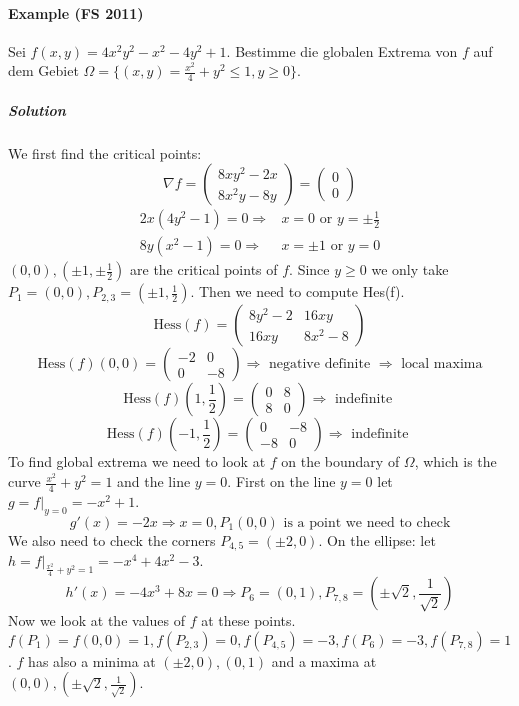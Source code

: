 \documentclass[11pt,a4paper]{book}
\begin{document}
\paragraph*{Example (FS 2011)}
Sei $f(x,y)=4x^2y^2-x^2-4y^2+1$. Bestimme die globalen Extrema von $f$ auf dem Gebiet $\Omega=\{(x,y)=\frac{x^2}{4}+y^2\leq 1, y\geq0\}$.
\subparagraph*{Solution}
We first find the critical points:
$$\nabla f=\begin{pmatrix} 8xy^2-2x \\ 8x^2y-8y \end{pmatrix} =  \begin{pmatrix}
0 \\ 
0
\end{pmatrix} $$
\begin{align*}
2x(4y^2-1)=0 \Rightarrow & x=0 \mbox{ or } y=\pm \frac{1}{2} \\
8y(x^2-1)=0 \Rightarrow & x=\pm 1 \mbox{ or } y=0
\end{align*}
$(0,0), (\pm 1, \pm \frac{1}{2})$ are the critical points of $f$. Since $y\geq 0$ we only take $P_1=(0,0), P_{2,3}=(\pm 1, \frac{1}{2})$. Then we need to compute Hes(f).
$$\mbox{Hess}(f)=\begin{pmatrix}
8y^2-2 & 16xy \\ 
16xy & 8x^2-8
\end{pmatrix} $$
$$\mbox{Hess}(f)(0,0)=\begin{pmatrix}
-2 & 0 \\ 
0 & -8
\end{pmatrix} \Rightarrow \mbox{ negative definite } \Rightarrow \mbox{ local maxima}$$ 
$$\mbox{Hess}(f)(1,\frac{1}{2})=\begin{pmatrix}
0 & 8 \\ 
8 & 0
\end{pmatrix} \Rightarrow \mbox{ indefinite }$$ 
$$\mbox{Hess}(f)(-1,\frac{1}{2})=\begin{pmatrix}
0 & -8 \\ 
-8 & 0
\end{pmatrix} \Rightarrow \mbox{ indefinite }$$ 
To find global extrema we need to look at $f$ on the boundary of $\Omega$, which is the curve $\frac{x^2}{4}+y^2=1$ and the line $y=0$. First on the line $y=0$ let $g=f|_{y=0}=-x^2+1$. $$g'(x)=-2x \Rightarrow x=0, P_1(0,0) \mbox{ is a point we need to check}$$
We also need to check the corners $P_{4,5}=(\pm 2,0)$. On the ellipse: let $h=f|_{\frac{x^2}{4}+y^2=1}=-x^4+4x^2-3$.
$$h'(x)=-4x^3+8x=0 \Rightarrow P_6=(0,1), P_{7,8}=(\pm \sqrt{2}, \frac{1}{\sqrt{2}})$$
Now we look at the values of $f$ at these points. $f(P_1)=f(0,0)=1, f(P_{2,3})=0, f(P_{4,5})=-3, f(P_6)=-3, f(P_{7,8})=1$. $f$ has also a minima at $(\pm 2,0), (0,1)$ and a maxima at $(0,0), (\pm \sqrt{2}, \frac{1}{\sqrt{2}})$.
\end{document}
